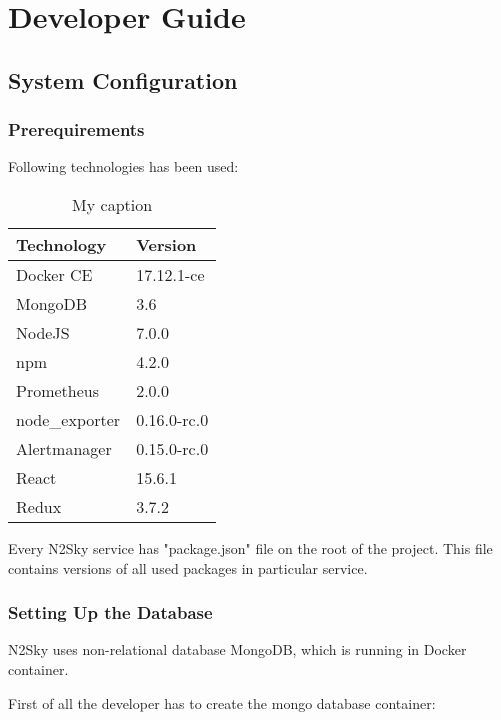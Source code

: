 \section{Developer Guide}\label{Developer Guide}

\subsection{System Configuration}\label{System configuration}

\subsubsection{Prerequirements}\label{Prerequirements}

Following technologies has been used:

\begin{table}[H]
\centering
\caption{My caption}
\label{my-label}
\begin{tabular}{|l|l|}
\hline
\textbf{Technology} & \textbf{Version} \\ \hline
Docker CE           & 17.12.1-ce       \\ \hline
MongoDB             & 3.6              \\ \hline
NodeJS              & 7.0.0            \\ \hline
npm                 & 4.2.0            \\ \hline
Prometheus          & 2.0.0            \\ \hline
node\_exporter      & 0.16.0-rc.0      \\ \hline
Alertmanager        & 0.15.0-rc.0      \\ \hline
React               & 15.6.1           \\ \hline
Redux               & 3.7.2            \\ \hline
\end{tabular}
\end{table}

Every N2Sky service has "package.json" file on the root of the project. This file contains versions of all used packages in particular service.
\subsubsection{Setting Up the Database}\label{database setup}

N2Sky uses non-relational database MongoDB, which is running in Docker container. 

First of all the developer has to create  the mongo database container:

